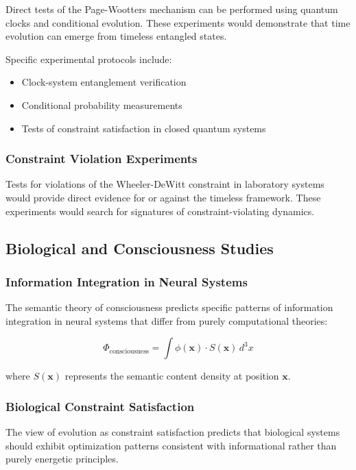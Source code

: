 \documentclass[12pt,a4paper]{article}
\begin{document}
Direct tests of the Page-Wootters mechanism can be performed using quantum clocks and conditional evolution. These experiments would demonstrate that time evolution can emerge from timeless entangled states.

Specific experimental protocols include:
\begin{itemize}
    \item Clock-system entanglement verification
    \item Conditional probability measurements
    \item Tests of constraint satisfaction in closed quantum systems
\end{itemize}

\subsubsection{Constraint Violation Experiments}

Tests for violations of the Wheeler-DeWitt constraint in laboratory systems would provide direct evidence for or against the timeless framework. These experiments would search for signatures of constraint-violating dynamics.

\subsection{Biological and Consciousness Studies}

\subsubsection{Information Integration in Neural Systems}

The semantic theory of consciousness predicts specific patterns of information integration in neural systems that differ from purely computational theories:

\begin{equation}
    \Phi_{\text{consciousness}} = \int \phi(\mathbf{x}) \cdot S(\mathbf{x}) \, d^3x
\end{equation}

where $S(\mathbf{x})$ represents the semantic content density at position $\mathbf{x}$.

\subsubsection{Biological Constraint Satisfaction}

The view of evolution as constraint satisfaction predicts that biological systems should exhibit optimization patterns consistent with informational rather than purely energetic principles.
\end{document}
